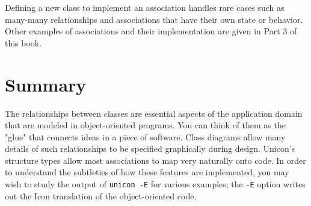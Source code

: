 
Defining a new class to implement an association handles
rare cases such as many-many relationships and associations that have
their own state or behavior. Other examples of associations and
their implementation are given in Part 3 of this book.

\section{Summary}

The relationships between classes are essential aspects of the
application domain that are modeled in object-oriented programs. You
can think of them as the "glue" that
connects ideas in a piece of software. Class diagrams allow many
details of such relationships to be specified graphically during
design. Unicon's structure types allow most
associations to map very naturally onto code.  In order
to understand the subtleties of how these features are implemented, you
may wish to study the output of \texttt{unicon -E} for various examples;
the \texttt{-E} option writes out the Icon translation of the
object-oriented code.
\clearpage
\bigskip
